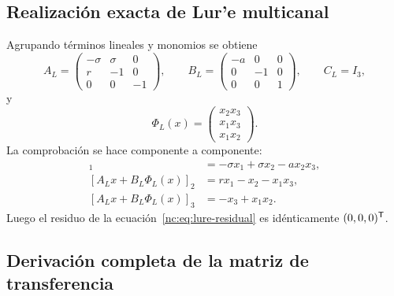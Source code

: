 \subsection{Realización exacta de Lur'e multicanal}

Agrupando términos lineales y monomios se obtiene
\begin{equation}
 A_L=
 \begin{pmatrix}
 -\sigma&\sigma&0\\ r&-1&0\\0&0&-1
 \end{pmatrix},\qquad
 B_L=
 \begin{pmatrix}
 -a&0&0\\0&-1&0\\0&0&1
 \end{pmatrix},
 \qquad C_L=I_3,
 \label{nc:eq:lorenz-abc}
\end{equation}
y
\begin{equation}
 \Phi_L(x)=
 \begin{pmatrix}
 x_2x_3\\x_1x_3\\x_1x_2
 \end{pmatrix}.
 \label{nc:eq:lorenz-phi}
\end{equation}
La comprobación se hace componente a componente:
\begin{align*}
 [A_Lx+B_L\Phi_L(x)]_1
 &=-\sigma x_1+\sigma x_2-a x_2x_3,\\
 [A_Lx+B_L\Phi_L(x)]_2
 &=r x_1-x_2-x_1x_3,\\
 [A_Lx+B_L\Phi_L(x)]_3
 &=-x_3+x_1x_2.
\end{align*}
Luego el residuo de la ecuación~\eqref{nc:eq:lure-residual} es idénticamente
\((0,0,0)^{\mathsf T}\).

\subsection{Derivación completa de la matriz de transferencia}


